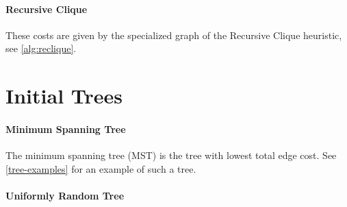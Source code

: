 \documentclass[a4paper, oneside]{discothesis}
\begin{document}
\paragraph{Recursive Clique} These costs are given by the specialized graph of the Recursive Clique heuristic, see \autoref{alg:reclique}.

%


\newpage
\section{Initial Trees}
\label{initial-trees}

\paragraph{Minimum Spanning Tree}\label{tree:mst}

The minimum spanning tree (MST) is the tree with lowest total edge cost. See \autoref{tree-examples} for an example of such a tree.

\paragraph{Uniformly Random Tree}\label{tree:random}
\end{document}
